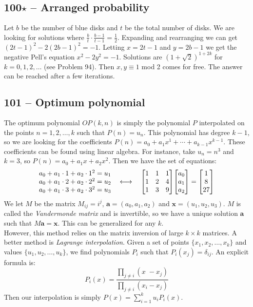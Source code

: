 \documentclass{article}
\begin{document}
\subsection*{100$\star$ -- Arranged probability} 
Let $b$ be the number of blue disks and $t$ be the total number of disks. 
We are looking for solutions where $\frac{b}{t} \cdot \frac{b-1}{t-1} = \frac{1}{2}$. 
Expanding and rearranging we can get $(2t-1)^2 - 2(2b-1)^2 = -1$. 
Letting $x = 2t-1$ and $y = 2b-1$ we get the negative Pell's equation $x^2 - 2y^2 = -1$. 
Solutions are $(1+\sqrt{2})^{1 + 2k}$ for $k = 0, 1, 2, \dotsc$ (see Problem 94).
Then $x, y \equiv 1$ mod 2 comes for free. 
The answer can be reached after a few iterations.

\subsection*{101 -- Optimum polynomial} 
The optimum polynomial $OP(k, n)$ is simply the polynomial $P$ interpolated on the points $n = 1, 2, \dotsc, k$ such that $P(n) = u_n$. 
This polynomial has degree $k-1$, so we are looking for the coefficients $P(n) = a_0 + a_1x^1 + \cdots + a_{k-1}x^{k-1}$. 
These coefficients can be found using linear algebra.
For instance, take $u_n = n^3$ and $k=3$, so $P(n) = a_0 + a_1x + a_2x^2$. 
Then we have the set of equations:
\[ \mqty{ a_0 + a_1\cdot1 + a_2\cdot1^2 = u_1 \\ a_0 + a_1\cdot2 + a_2\cdot2^2 = u_2 \\ a_0 + a_1\cdot3 + a_2\cdot3^2 = u_3 }
\quad\longleftrightarrow\quad \mqty[ 1 & 1 & 1 \\ 1 & 2 & 4 \\ 1 & 3 & 9 ] \mqty[ a_0 \\ a_1 \\ a_2 ] = \mqty[ 1 \\ 8 \\ 27 ] \]
We let $M$ be the matrix $M_{ij} = i^j$, $\mathbf{a} = (a_0, a_1, a_2)$ and $\mathbf{x} = (u_1, u_2, u_3)$. 
$M$ is called the \emph{Vandermonde matrix} and is invertible, so we have a unique solution $\mathbf{a}$ such that $M\mathbf{a} = \mathbf{x}$. 
This can be generalized for any $k$. \\

However, this method relies on the matrix inversion of large $k \times k$ matrices. 
A better method is \emph{Lagrange interpolation}. 
Given a set of points $\{x_1, x_2, \dotsc, x_k\}$ and values $\{u_1, u_2, \dotsc, u_k\}$, we find polynomials $P_i$ such that $P_i(x_j) = \delta_{ij}$. 
An explicit formula is:
$$ P_i(x) = \frac{\prod_{j \neq i}(x_{\phantom{i}} - x_j)}{\prod_{j \neq i}(x_i - x_j)}$$
Then our interpolation is simply $P(x) = \sum\limits_{i=1}^k u_i P_i(x)$.
\end{document}
